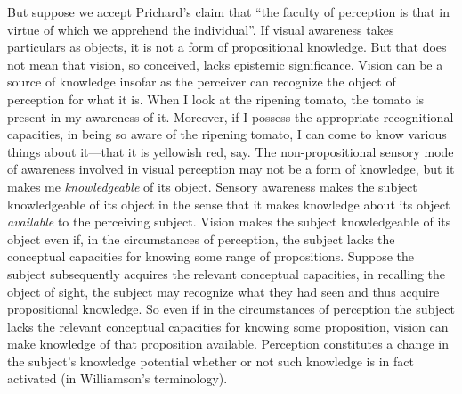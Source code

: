 \documentclass[12pt]{article}
\begin{document}
But suppose we accept Prichard's claim that ``the faculty of perception is that in virtue of which we apprehend the individual''. If visual awareness takes particulars as objects, it is not a form of propositional knowledge. But that does not mean that vision, so conceived, lacks epistemic significance. Vision can be a source of knowledge insofar as the perceiver can recognize the object of perception for what it is. When I look at the ripening tomato, the tomato is present in my awareness of it. Moreover, if I possess the appropriate recognitional capacities, in being so aware of the ripening tomato, I can come to know various things about it---that it is yellowish red, say. The non-propositional sensory mode of awareness involved in visual perception may not be a form of knowledge, but it makes me \emph{knowledgeable} of its object. Sensory awareness makes the subject knowledgeable of its object in the sense that it makes knowledge about its object \emph{available} to the perceiving subject. Vision makes the subject knowledgeable of its object even if, in the circumstances of perception, the subject lacks the conceptual capacities for knowing some range of propositions. Suppose the subject subsequently acquires the relevant conceptual capacities, in recalling the object of sight, the subject may recognize what they had seen and thus acquire propositional knowledge. So even if in the circumstances of perception the subject lacks the relevant conceptual capacities for knowing some proposition, vision can make knowledge of that proposition available. Perception constitutes a change in the subject's knowledge potential whether or not such knowledge is in fact activated (in Williamson's \citeyear{Williamson:1990uq} terminology).
\end{document}
